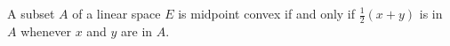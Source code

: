A subset $A$ of a linear space $E$ is midpoint convex if and only if $\frac{1}{2}(x + y)$ is in $A$ whenever $x$ and $y$ are in $A$.

